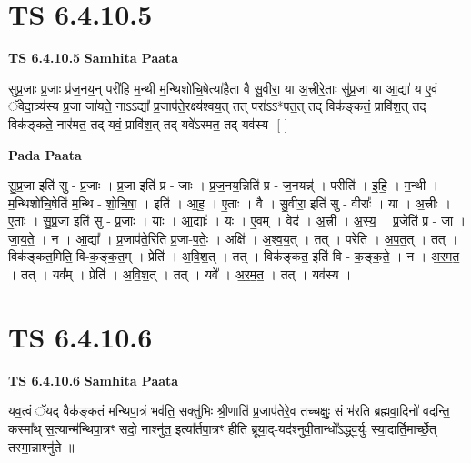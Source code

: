\documentclass[17pt]{extarticle}
\begin{document}

\section{ TS 6.4.10.5 }

\textbf{TS 6.4.10.5 } \newline
\textbf{Samhita Paata} \newline

सुप्र॒जाः प्र॒जाः प्र॑ज॒नय॒न् परी॑हि म॒न्थी म॒न्थिशो॑चि॒षेत्या॑है॒ता वै सु॒वीरा॒ या अ॒त्त्रीरे॒ताः सु॑प्र॒जा या आ॒द्या॑ य ए॒वं ॅवेदा॒त्र्य॑स्य प्र॒जा जा॑यते॒ नाऽऽद्या᳚ प्र॒जाप॑ते॒रक्ष्य॑श्वय॒त् तत् परा॑ऽऽ*पत॒त् तद् विक॑ङ्कतं॒ प्रावि॑श॒त् तद् विक॑ङ्कते॒ नार॑मत॒ तद् यवं॒ प्रावि॑श॒त् तद् यवे॑ऽरमत॒ तद् यव॑स्य- [  ] \newline

\textbf{Pada Paata} \newline

सु॒प्र॒जा इति॑ सु - प्र॒जाः । प्र॒जा इति॑ प्र - जाः । प्र॒ज॒नय॒न्निति॑ प्र - ज॒नयन्न्॑ । परीति॑ । इ॒हि॒ । म॒न्थी । म॒न्थिशो॑चि॒षेति॑ म॒न्थि - शो॒चि॒षा॒ । इति॑ । आ॒ह॒ । ए॒ताः । वै । सु॒वीरा॒ इति॑ सु - वीराः᳚ । या । अ॒त्त्रीः । ए॒ताः । सु॒प्र॒जा इति॑ सु - प्र॒जाः । याः । आ॒द्याः᳚ । यः । ए॒वम् । वेद॑ । अ॒त्त्री । अ॒स्य॒ । प्र॒जेति॑ प्र - जा । जा॒य॒ते॒ । न । आ॒द्या᳚ । प्र॒जाप॑ते॒रिति॑ प्र॒जा-प॒तेः॒ । अक्षि॑ । अ॒श्व॒य॒त् । तत् । परेति॑ । अ॒प॒त॒त् । तत् । विक॑ङ्कत॒मिति॒ वि-क॒ङ्क॒त॒म् । प्रेति॑ । अ॒वि॒श॒त् । तत् । विक॑ङ्कत॒ इति॑ वि - क॒ङ्क॒ते॒ । न । अ॒र॒म॒त॒ । तत् । यव᳚म् । प्रेति॑ । अ॒वि॒श॒त् । तत् । यवे᳚ । अ॒र॒म॒त॒ । तत् । यव॑स्य ।  \newline





\section{ TS 6.4.10.6 }

\textbf{TS 6.4.10.6 } \newline
\textbf{Samhita Paata} \newline

यव॒त्वं ॅयद् वैक॑ङ्कतं मन्थिपा॒त्रं भव॑ति॒ सक्तु॑भिः श्री॒णाति॑ प्र॒जाप॑तेरे॒व तच्चक्षुः॒ सं भ॑रति ब्रह्मवा॒दिनो॑ वदन्ति॒ कस्मा᳚थ् स॒त्यान्म॑न्थिपा॒त्रꣳ सदो॒ नाश्नु॑त॒ इत्या᳚र्तपा॒त्रꣳ हीति॑ ब्रूया॒द्-यद॑श्नुवी॒तान्धो᳚ऽद्ध्व॒र्युः स्या॒दार्ति॒मार्च्छे॒त् तस्मा॒न्नाश्नु॑ते ॥ \newline
\end{document}
